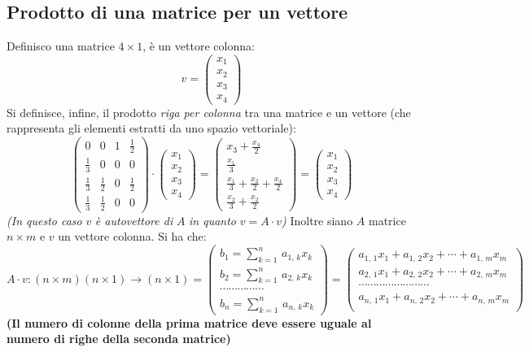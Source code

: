 \documentclass[a4paper,12pt, oneside]{book}
\begin{document}
\subsection{Prodotto di una matrice per un vettore}
Definisco una matrice $4\times 1$, è un vettore colonna:
$$v=\left(\begin{matrix}
x_1\\
x_2\\
x_3\\
x_4
\end{matrix}\right)$$
Si definisce, infine, il prodotto \textit{riga per colonna} tra una matrice e un vettore (che rappresenta gli elementi estratti da uno spazio vettoriale):
$$\left(\begin{matrix}
0 & 0 & 1 & \frac{1}{2}\\
\frac{1}{3} & 0 & 0 & 0\\
\frac{1}{3} & \frac{1}{2} & 0 & \frac{1}{2}\\
\frac{1}{3} & \frac{1}{2} & 0 & 0
\end{matrix}\right)\cdot \left(\begin{matrix}
x_1\\
x_2\\
x_3\\
x_4
\end{matrix}\right)=\left(\begin{matrix}
x_3+\frac{x_4}{2} \\
\frac{x_1}{3}\\
\frac{x_1}{3}+\frac{x_2}{2}+\frac{x_4}{2}\\
\frac{x_2}{3} +\frac{x_2}{2}
\end{matrix}\right)=\left(\begin{matrix}
x_1\\
x_2\\
x_3\\
x_4
\end{matrix}\right)
$$
\textit{(In questo caso} $v$ \textit{è autovettore di }$A$ \textit{in quanto} $v=A\cdot v$\textit{)}
Inoltre siano $A$ matrice $n\times	m$ e $v$ un vettore colonna. Si ha che:
$$A\cdot v:(n\times m)(n\times 1)\rightarrow (n\times 1)=\left(\begin{matrix}
b_1=\sum_{k=1}^n\,a_{1,\,k}x_k\\
b_2=\sum_{k=1}^n\,a_{2,\,k}x_k\\
\cdots\cdots\cdots\cdots\cdots\\
b_n=\sum_{k=1}^n\,a_{n,\,k}x_k
\end{matrix}\right)=\left(\begin{matrix}
a_{1,\,1}x_1+a_{1,\,2}x_2+\cdots+a_{1,\,m}x_m\\
a_{2,\,1}x_1+a_{2,\,2}x_2+\cdots+a_{2,\,m}x_m\\
\cdots\cdots\cdots\cdots\cdots\cdots\cdots\cdots\\
a_{n,\,1}x_1+a_{n,\,2}x_2+\cdots+a_{n,\,m}x_m\\
\end{matrix}\right)$$
\textbf{(Il numero di colonne della prima matrice deve essere uguale al numero di righe della seconda matrice)}
\end{document}
